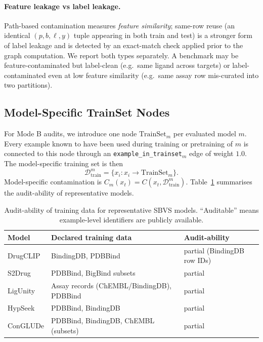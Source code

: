 \documentclass[11pt]{article}
\begin{document}
\paragraph{Feature leakage vs label leakage.}
Path-based contamination measures \emph{feature similarity}; same-row reuse (an identical \((p, b, \ell, y)\) tuple appearing in both train and test) is a stronger form of label leakage and is detected by an exact-match check applied prior to the graph computation. We report both types separately. A benchmark may be feature-contaminated but label-clean (e.g.\ same ligand across targets) or label-contaminated even at low feature similarity (e.g.\ same assay row mis-curated into two partitions).

\subsection{Model-Specific TrainSet Nodes}

For Mode B audits, we introduce one node \(\mathrm{TrainSet}_m\) per evaluated model \(m\). Every example known to have been used during training or pretraining of \(m\) is connected to this node through an \texttt{example\_in\_trainset}\(_m\) edge of weight \(1.0\). The model-specific training set is then
\[
\mathcal{D}^{m}_{\mathrm{train}} = \{x_i : x_i \to \mathrm{TrainSet}_m\}.
\]
Model-specific contamination is \(C_m(x_t) = C(x_t, \mathcal{D}^{m}_{\mathrm{train}})\). Table~\ref{tab:modeltrain} summarises the audit-ability of representative models.

\begin{table}[h]
\centering
\caption{Audit-ability of training data for representative SBVS models. ``Auditable'' means example-level identifiers are publicly available.}
\label{tab:modeltrain}
\begin{tabular}{lll}
\toprule
\textbf{Model} & \textbf{Declared training data} & \textbf{Audit-ability} \\
\midrule
DrugCLIP & BindingDB, PDBBind & partial (BindingDB row IDs) \\
S2Drug & PDBBind, BigBind subsets & partial \\
LigUnity & Assay records (ChEMBL/BindingDB), PDBBind & partial \\
HypSeek & PDBBind, BindingDB & partial \\
ConGLUDe & PDBBind, BindingDB, ChEMBL (subsets) & partial \\
\bottomrule
\end{tabular}
\end{table}
\end{document}
